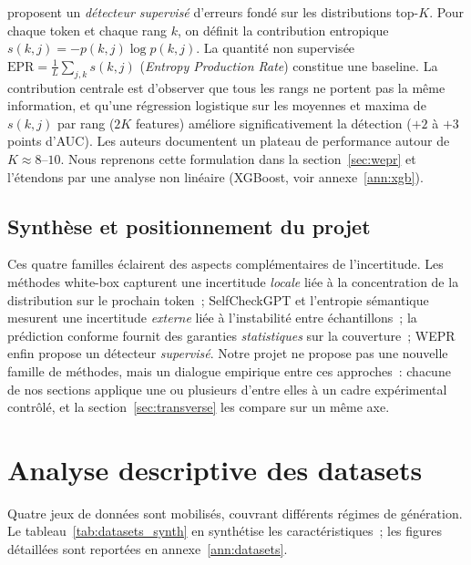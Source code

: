 \documentclass[12pt,a4paper]{article}
\begin{document}
\citet{moslonka2026} proposent un \emph{détecteur supervisé} d'erreurs fondé sur les distributions top-$K$. Pour chaque token et chaque rang $k$, on définit la contribution entropique $s(k,j) = -p(k,j)\log p(k,j)$. La quantité non supervisée $\mathrm{EPR} = \tfrac{1}{L}\sum_{j,k} s(k,j)$ (\textit{Entropy Production Rate}) constitue une baseline. La contribution centrale est d'observer que tous les rangs ne portent pas la même information, et qu'une régression logistique sur les moyennes et maxima de $s(k,j)$ par rang ($2K$ features) améliore significativement la détection ($+2$ à $+3$ points d'AUC). Les auteurs documentent un plateau de performance autour de $K \approx 8$--$10$. Nous reprenons cette formulation dans la section~\ref{sec:wepr} et l'étendons par une analyse non linéaire (XGBoost, voir annexe~\ref{ann:xgb}).

\subsection{Synthèse et positionnement du projet}

Ces quatre familles éclairent des aspects complémentaires de l'incertitude. Les méthodes white-box capturent une incertitude \emph{locale} liée à la concentration de la distribution sur le prochain token~; SelfCheckGPT et l'entropie sémantique mesurent une incertitude \emph{externe} liée à l'instabilité entre échantillons~; la prédiction conforme fournit des garanties \emph{statistiques} sur la couverture~; WEPR enfin propose un détecteur \emph{supervisé}. Notre projet ne propose pas une nouvelle famille de méthodes, mais un dialogue empirique entre ces approches~: chacune de nos sections applique une ou plusieurs d'entre elles à un cadre expérimental contrôlé, et la section~\ref{sec:transverse} les compare sur un même axe.


\section{Analyse descriptive des datasets}

Quatre jeux de données sont mobilisés, couvrant différents régimes de génération. Le tableau~\ref{tab:datasets_synth} en synthétise les caractéristiques~; les figures détaillées sont reportées en annexe~\ref{ann:datasets}.
\end{document}
